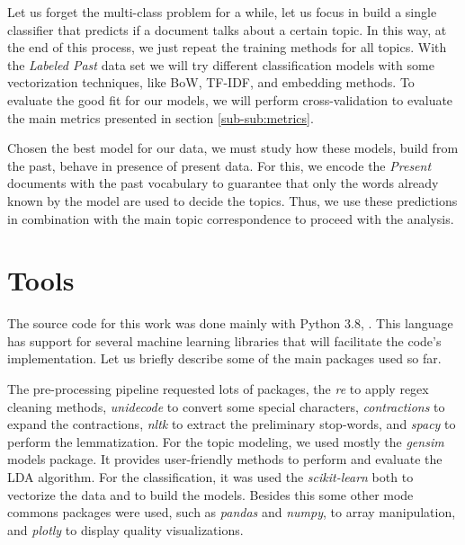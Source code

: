 Let us forget the multi-class problem for a while, let us focus in build a single classifier that predicts if a document talks about a certain topic. In this way, at the end of this process, we just repeat the training methods for all topics. With the \textit{Labeled Past} data set we will try different classification models with some vectorization techniques, like BoW, TF-IDF, and embedding methods. To evaluate the good fit for our models, we will perform cross-validation to evaluate the main metrics presented in section \ref{sub-sub:metrics}.

Chosen the best model for our data, we must study how these models, build from the past, behave in presence of present data. For this, we encode the \textit{Present} documents with the past vocabulary to guarantee that only the words already known by the model are used to decide the topics. Thus, we use these predictions in combination with the main topic correspondence to proceed with the analysis.

\section{Tools}

The source code for this work was done mainly with Python 3.8, \cite{python}. This language has support for several machine learning libraries that will facilitate the code's implementation. Let us briefly describe some of the main packages used so far.

The pre-processing pipeline requested lots of packages, the \textit{re} to apply regex cleaning methods, \textit{unidecode} to convert some special characters, \textit{contractions} to expand the contractions, \textit{nltk} to extract the preliminary stop-words, and \textit{spacy} to perform the lemmatization. For the topic modeling, we used mostly the \textit{gensim} models package. It provides user-friendly methods to perform and evaluate the LDA algorithm. For the classification, it was used the \textit{scikit-learn} both to vectorize the data and to build the models. Besides this some other mode commons packages were used, such as \textit{pandas} and \textit{numpy}, to array manipulation, and \textit{plotly} to display quality visualizations.

%
%

